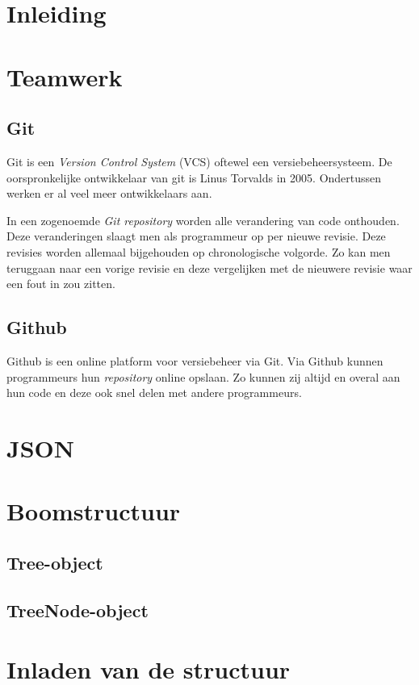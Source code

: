 \section{Inleiding}

\section{Teamwerk}
\subsection{Git}
Git is een \textit{Version Control System} (VCS) oftewel een versiebeheersysteem. De oorspronkelijke ontwikkelaar van git is Linus Torvalds in 2005.\cite{init_git} Ondertussen werken er al veel meer ontwikkelaars aan.

In een zogenoemde \textit{Git repository} worden alle verandering van code onthouden. Deze veranderingen slaagt men als programmeur op per nieuwe revisie. Deze revisies worden allemaal bijgehouden op chronologische volgorde. Zo kan men teruggaan naar een vorige revisie en deze vergelijken met de nieuwere revisie waar een fout in zou zitten.
\subsection{Github}
Github is een online platform voor versiebeheer via Git. Via Github kunnen programmeurs hun \textit{repository} online opslaan. Zo kunnen zij altijd en overal aan hun code en deze ook snel delen met andere programmeurs.

\section{JSON}



\section{Boomstructuur}
\subsection{Tree-object}
\subsection{TreeNode-object}

\section{Inladen van de structuur}

